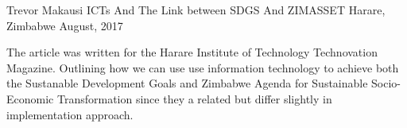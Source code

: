 

\begin{cventries}

  \cventry
    {Trevor Makausi} %
    {ICTs And The Link between SDGS And ZIMASSET} %
    {Harare, Zimbabwe} %
    {August, 2017} %
    {
      \begin{cvitems} %
        \item {The article was written for the Harare Institute of Technology Technovation Magazine. Outlining how we can use use information technology to achieve both the Sustanable Development Goals and Zimbabwe Agenda for Sustainable Socio-Economic Transformation since they a related but differ slightly in implementation approach.}
      \end{cvitems}
    }


\end{cventries}
